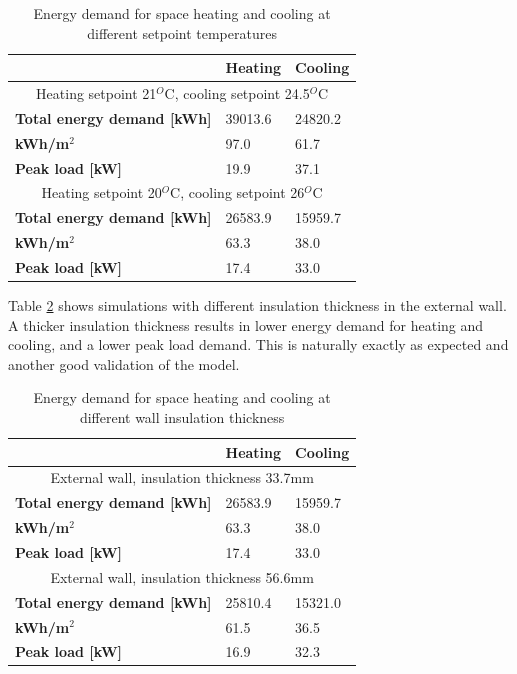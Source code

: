 \begin{table}[h!]
    \centering
        \caption{Energy demand for space heating and cooling at different setpoint temperatures}
    \begin{tabular}{|p{2.8cm}|p{1.8cm}|p{1.8cm}|}
         \hline
        & \textbf{Heating} & \textbf{Cooling} \\
        \hline
    \multicolumn{3}{|c|}{Heating setpoint 21$^O$C, cooling setpoint 24.5$^O$C} \\
    \hline
        \textbf{Total energy demand [kWh]} & 39013.6 & 24820.2 \\
        \hline
        \textbf{kWh/m$^2$} & 97.0  & 61.7 \\
        \hline
        \textbf{Peak load [kW]} & 19.9 & 37.1 \\
        \hline
    \multicolumn{3}{|c|}{Heating setpoint 20$^O$C, cooling setpoint 26$^O$C} \\
        \hline
        \textbf{Total energy demand [kWh]} & 26583.9 & 15959.7 \\
        \hline
        \textbf{kWh/m$^2$} & 63.3  & 38.0 \\
        \hline
        \textbf{Peak load [kW]} & 17.4 & 33.0 \\
        \hline
    \end{tabular}
    \label{tab:comp}
\end{table}

Table \ref{tab:com} shows simulations with different insulation thickness in the external wall. A thicker insulation thickness results in lower energy demand for heating and cooling, and a lower peak load demand. This is naturally exactly as expected and another good validation of the model. 

\begin{table}[h!]
    \centering
        \caption{Energy demand for space heating and cooling at different wall insulation thickness}
    \begin{tabular}{|p{2.8cm}|p{1.8cm}|p{1.8cm}|}
         \hline
        & \textbf{Heating} & \textbf{Cooling} \\
        \hline
    \multicolumn{3}{|c|}{External wall, insulation thickness 33.7mm} \\
        \hline
        \textbf{Total energy demand [kWh]} & 26583.9 & 15959.7 \\
        \hline
        \textbf{kWh/m$^2$} & 63.3  & 38.0 \\
        \hline
        \textbf{Peak load [kW]} & 17.4 & 33.0 \\
        \hline
    \multicolumn{3}{|c|}{External wall, insulation thickness 56.6mm} \\
        \hline
        \textbf{Total energy demand [kWh]} & 25810.4 & 15321.0 \\
        \hline
        \textbf{kWh/m$^2$} & 61.5  & 36.5 \\
        \hline
        \textbf{Peak load [kW]} & 16.9 & 32.3 \\
        \hline
    \end{tabular}
    \label{tab:com}
\end{table}

